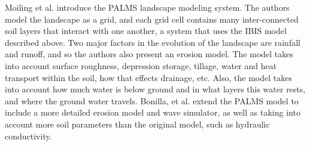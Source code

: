 
 Moiling et al. \cite{Moiling-DistributedRunoff} introduce the PALMS landscape modeling system. The authors model the landscape as a grid, and each grid cell contains many inter-connected soil layers that interact with one another, a system that uses the IBIS model described above. Two major factors in the evolution of the landscape are rainfall and runoff, and so the authors also present an erosion model. The model takes into account surface roughness, depression storage, tillage, water and heat transport within the soil, how that effects drainage, etc. Also, the model takes into account how much water is below ground and in what layers this water rests, and where the ground water travels. 
% 
Bonilla, et al. \cite{Bonilla-TestingGridBasedSoil}  extend the PALMS model to include a more detailed erosion model and wave simulator, as well as taking into account more soil parameters than the original model, such as hydraulic conductivity. 


